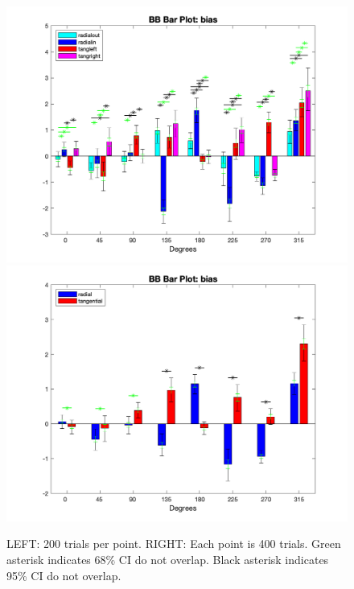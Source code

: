 \documentclass[11pt]{article} %
\begin{document}
\begin{figure}[H]
\centering %
\includegraphics[scale=.35]{Images/BB_BP_bias_Alldata_4conds.png}
\includegraphics[scale=.35]{Images/BB_BP_bias_Alldata_2conds.png}
\caption{LEFT: 200 trials per point. RIGHT: Each point is 400 trials. Green asterisk indicates 68\% CI do not overlap. Black asterisk indicates 95\% CI do not overlap.}
\end{figure}
\end{document}
